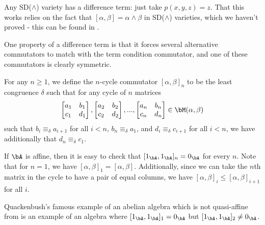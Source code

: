 \begin{ex} Any SD($\wedge$) variety has a difference term: just take $p(x,y,z) = z$. That this works relies on the fact that $[\alpha,\beta] = \alpha\wedge\beta$ in SD($\wedge$) varieties, which we haven't proved - this can be found in \cite{kearnes-taylor-affine}.
\end{ex}

One property of a difference term is that it forces several alternative commutators to match with the term condition commutator, and one of these commutators is clearly symmetric.

\begin{defn} For any $n \ge 1$, we define the $n$-cycle commutator $[\alpha,\beta]_n$ to be the least congruence $\delta$ such that for any cycle of $n$ matrices
\[
\begin{bmatrix} a_1 & b_1\\ c_1 & d_1\end{bmatrix}, \begin{bmatrix} a_2 & b_2\\ c_2 & d_2\end{bmatrix}, ..., \begin{bmatrix} a_n & b_n\\ c_n & d_n\end{bmatrix} \in \bM(\alpha,\beta)
\]
such that $b_i \equiv_\delta a_{i+1}$ for all $i < n$, $b_n \equiv_\delta a_1$, and $d_i \equiv_\delta c_{i+1}$ for all $i < n$, we have additionally that $d_n \equiv_\delta c_1$.
\end{defn}

If $\bA$ is affine, then it is easy to check that $[1_\bA,1_\bA]_n = 0_\bA$ for every $n$. Note that for $n = 1$, we have $[\alpha,\beta]_1 = [\alpha,\beta]$. Additionally, since we can take the $n$th matrix in the cycle to have a pair of equal columns, we have $[\alpha,\beta]_i \le [\alpha,\beta]_{i+1}$ for all $i$.

Quackenbush's famous example of an abelian algebra which is not quasi-affine from \cite{quasi-affine-quackenbush} is an example of an algebra where $[1_\bA,1_\bA]_1 = 0_\bA$ but $[1_\bA,1_\bA]_2 \ne 0_\bA$.

